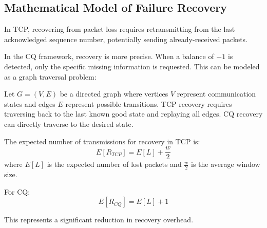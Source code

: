 \documentclass[../../../OAE-SPEC-MAIN.tex]{subfiles}
\begin{document}
\subsection{Mathematical Model of Failure Recovery}

In TCP, recovering from packet loss requires retransmitting from the last acknowledged sequence number, potentially sending already-received packets.

In the CQ framework, recovery is more precise. When a balance of $-1$ is detected, only the specific missing information is requested. This can be modeled as a graph traversal problem:

Let $G = (V, E)$ be a directed graph where vertices $V$ represent communication states and edges $E$ represent possible transitions. TCP recovery requires traversing back to the last known good state and replaying all edges. CQ recovery can directly traverse to the desired state.

The expected number of transmissions for recovery in TCP is:
\begin{equation}
E[R_{TCP}] = E[L] + \frac{w}{2}
\end{equation}
where $E[L]$ is the expected number of lost packets and $\frac{w}{2}$ is the average window size.

For CQ:
\begin{equation}
E[R_{CQ}] = E[L] + 1
\end{equation}

This represents a significant reduction in recovery overhead.
\end{document}
